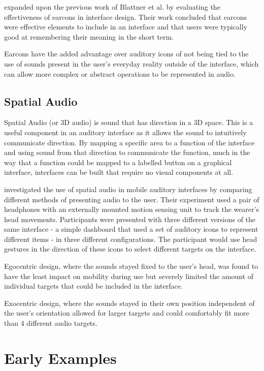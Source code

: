 \documentclass{l4proj}
\begin{document}
\cite{brewster_evaluation_1993} expanded upon the previous work of Blattner et al. by evaluating the effectiveness of earcons in interface design. Their work concluded that earcons were effective elements to include in an interface and that users were typically good at remembering their meaning in the short term. 

Earcons have the added advantage over auditory icons of not being tied to the use of sounds present in the user's everyday reality outside of the interface, which can allow more complex or abstract operations to be represented in audio.

\subsection{Spatial Audio}
Spatial Audio (or 3D audio) is sound that has direction in a 3D space. This is a useful component in an auditory interface as it allows the sound to intuitively communicate direction. By mapping a specific area to a function of the interface and using sound from that direction to communicate the function, much in the way that a function could be mapped to a labelled button on a graphical interface, interfaces can be built that require no visual components at all.

\cite{brewster_multimodal_2003} investigated the use of spatial audio in mobile auditory interfaces by comparing different methods of presenting audio to the user. Their experiment used a pair of headphones with an externally mounted motion sensing unit to track the wearer's head movements. Participants were presented with three different versions of the same interface - a simple dashboard that used a set of auditory icons to represent different items - in three different configurations. The participant would use head gestures in the direction of these icons to select different targets on the interface.

Egocentric design, where the sounds stayed fixed to the user's head, was found to have the least impact on mobility during use but severely limited the amount of individual targets that could be included in the interface.

Exocentric design, where the sounds stayed in their own position independent of the user's orientation allowed for larger targets and could comfortably fit more than 4 different audio targets.

\section{Early Examples}
\end{document}
